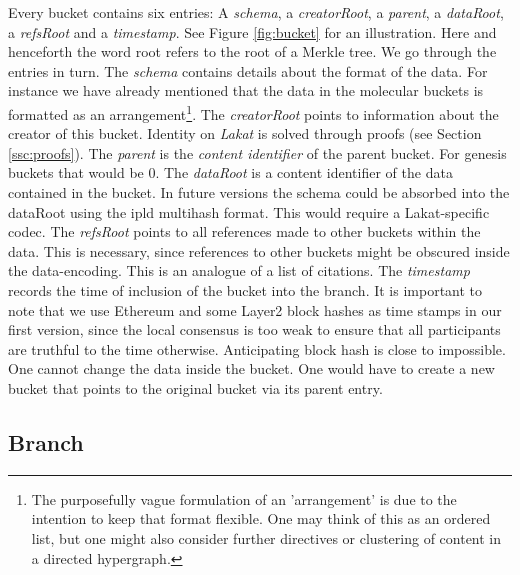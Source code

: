 \documentclass[14pt]{article}
\begin{document}
Every bucket contains six entries: A \textit{schema}, a \textit{creatorRoot}, a \textit{parent}, a \textit{dataRoot}, a \textit{refsRoot} and a \textit{timestamp}. See Figure \ref{fig:bucket} for an illustration. Here and henceforth the word root refers to the root of a Merkle tree. We go through the entries in turn. The \textit{schema} contains details about the format of the data. For instance we have already mentioned that the data in the molecular buckets is formatted as an arrangement\footnote{The purposefully vague formulation of an 'arrangement' is due to the intention to keep that format flexible. One may think of this as an ordered list, but one might also consider further directives or clustering of content in a directed hypergraph.}. The \textit{creatorRoot} points to information about the creator of this bucket. Identity on \textit{Lakat} is solved through proofs (see Section \ref{ssc:proofs}). The \textit{parent} is the \textit{content identifier} of the parent bucket. For genesis buckets that would be 0. The \textit{dataRoot} is a content identifier of the data contained in the bucket. In future versions the schema could be absorbed into the dataRoot using the ipld multihash format. This would require a Lakat-specific codec. The \textit{refsRoot} points to all references made to other buckets within the data. This is necessary, since references to other buckets might be obscured inside the data-encoding. This is an analogue of a list of citations. The \textit{timestamp} records the time of inclusion of the bucket into the branch. It is important to note that we use Ethereum \cite{buterin2013ethereum} and some Layer2 block hashes as time stamps in our first version, since the local consensus is too weak to ensure that all participants are truthful to the time otherwise. Anticipating block hash is close to impossible. One cannot change the data inside the bucket. One would have to create a new bucket that points to the original bucket via its parent entry. 




\subsection{Branch}
\label{ssc:branch}
\end{document}
